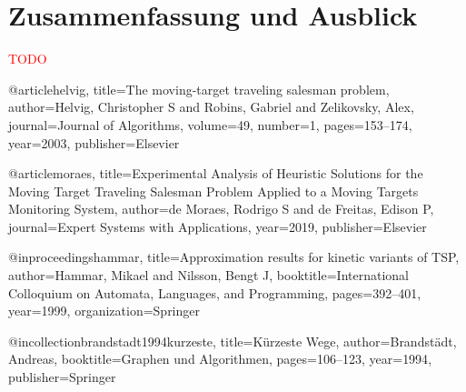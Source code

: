 \documentclass[german,version-2019-11]{uzl-thesis}
\begin{document}
\chapter{Zusammenfassung und Ausblick}
\textcolor{red}{TODO}



\begin{bibtex-entries}
@article{helvig,
  title={The moving-target traveling salesman problem},
  author={Helvig, Christopher S and Robins, Gabriel and Zelikovsky, Alex},
  journal={Journal of Algorithms},
  volume={49},
  number={1},
  pages={153--174},
  year={2003},
  publisher={Elsevier}
}

@article{moraes,
  title={Experimental Analysis of Heuristic Solutions for the Moving Target Traveling Salesman Problem Applied to a Moving Targets Monitoring System},
  author={de Moraes, Rodrigo S and de Freitas, Edison P},
  journal={Expert Systems with Applications},
  year={2019},
  publisher={Elsevier}
}

@inproceedings{hammar,
  title={Approximation results for kinetic variants of TSP},
  author={Hammar, Mikael and Nilsson, Bengt J},
  booktitle={International Colloquium on Automata, Languages, and Programming},
  pages={392--401},
  year={1999},
  organization={Springer}
}

@incollection{brandstadt1994kurzeste,
  title={K{\"u}rzeste Wege},
  author={Brandst{\"a}dt, Andreas},
  booktitle={Graphen und Algorithmen},
  pages={106--123},
  year={1994},
  publisher={Springer}
}
\end{bibtex-entries}



%
%
%
%
\end{document}
